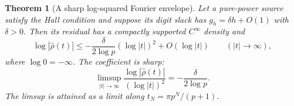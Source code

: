 \documentclass[11pt,a4paper]{article}
\newtheorem{theorem}{Theorem}[section]
\theoremstyle{remark}
\newcommand{\cf}[1]{\widehat{#1}}
\begin{document}
\begin{theorem}[A sharp log-squared Fourier envelope]
\label{thm:sharp}
Let a pure-power source satisfy the Hall condition and suppose its digit slack
has $g_h=\delta h+O(1)$ with $\delta>0$. Then its residual has a compactly
supported $C^\infty$ density and
\begin{equation}
 \log|\cf\rho(t)|\le
 -\frac{\delta}{2\log p}(\log|t|)^2+O(\log|t|)
 \qquad(|t|\to\infty),
 \label{eq:fourier-upper}
\end{equation}
where $\log0=-\infty$. The coefficient is sharp:
\begin{equation}
 \limsup_{|t|\to\infty}
 \frac{\log|\cf\rho(t)|}{(\log|t|)^2}
 =-\frac{\delta}{2\log p}.
 \label{eq:fourier-limsup}
\end{equation}
The limsup is attained as a limit along $t_N=\pi p^N/(p+1)$.
\end{theorem}
\end{document}
